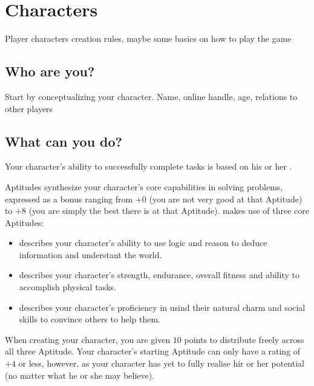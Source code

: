 \chapter{Characters}

Player characters creation rules, maybe some basics on how to play the game

\section{Who are you?}

Start by conceptualizing your character.
Name, online handle, age, relations to other players

\section{What can you do?}

Your character's ability to successfully complete tasks is based on his or her .

Aptitudes synthesize your character's core capabilities in solving problems, expressed as a bonus ranging from
$+0$ (you are not very good at that Aptitude) to $+8$ (you are simply the best there is at that Aptitude).
\ParadoxSpaceRPG{} makes use of three core Aptitudes:
\begin{itemize}
\item {} describes your character's ability to use logic and reason to deduce information and
	understant the world.
\item {} describes your character's strength, endurance, overall fitness and ability to
	accomplish physical tasks.
\item {} describes your character's proficiency in usind their natural charm and social skills
	to convince others to help them.
\end{itemize}
When creating your character, you are given $10$ points to distribute freely across all three Aptitude. Your
character's starting Aptitude can only have a rating of $+4$ or less, however, as your character has yet to
fully realise hir or her potential (no matter what he or she may believe).

